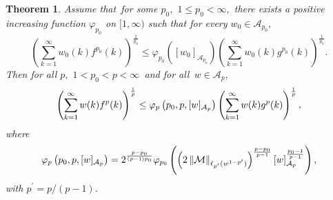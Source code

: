 \documentclass[a4paper]{amsart}
\theoremstyle{plain}
\newtheorem{theorem}{Theorem}[section]
\numberwithin{equation}{section}
\begin{document}
\begin{theorem}
\label{T2}Assume that\ for some $p_{0},$ $1\leq p_{0}<\infty ,$ there exists
a positive increasing function $\mathcal{\varphi }_{p_{0}}$ on $[1,\infty )$
such that for every $w_{0}\in \mathcal{A}_{p_{0}},$%
\begin{equation}
\left( \sum_{k=1}^{\infty }w_{0}(k)f^{p_{0}}(k)\right) ^{\frac{1}{p_{0}}%
}\leq \mathcal{\varphi }_{p_{0}}\left( [w_{0}]_{\mathcal{A}_{p_{0}}}\right)
\left( \sum_{k=1}^{\infty }w_{0}(k)g^{p_{0}}(k)\right) ^{\frac{1}{p_{0}}}.
\label{*2}
\end{equation}%
Then for all $p,$ $1<p_{0}<p<\infty $\ and for all\ $w\in \mathcal{A}_{p},$%
\begin{equation}
\left( \sum_{k=1}^{\infty }w(k)f^{p}(k)\right) ^{\frac{1}{p}}\leq \mathcal{%
\varphi }_{p}\left( p_{0},p,[w]_{\mathcal{A}_{p}}\right) \left(
\sum_{k=1}^{\infty }w(k)g^{p}(k)\right) ^{\frac{1}{p}},  \label{*12}
\end{equation}%
where 
\begin{equation}
\mathcal{\varphi }_{p}\left( p_{0},p,[w]_{\mathcal{A}_{p}}\right) =2^{\frac{%
p-p_{0}}{\left( p-1\right) p_{0}}}\mathcal{\varphi }_{p_{0}}\left( \left(
2\left\Vert \mathcal{M}\right\Vert _{\ell _{p^{\prime }}(w^{1-p^{\prime
}})}\right) ^{\frac{p-p_{0}}{p-1}}\left[ w\right] _{\mathcal{A}_{p}}^{\frac{%
p_{0}-1}{p-1}}\right) ,  \label{**12}
\end{equation}%
with $p^{\prime }=p/\left( p-1\right) .$
\end{theorem}
\end{document}
